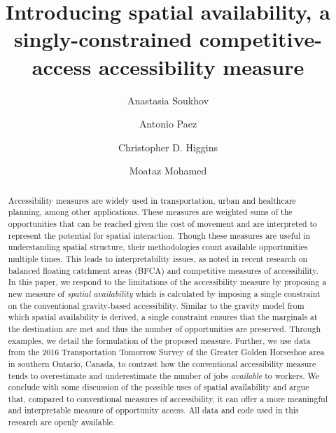 \documentclass[]{elsarticle} %
\begin{document}
\begin{frontmatter}

  \title{Introducing spatial availability, a singly-constrained
competitive-access accessibility measure}
    \author[SEES]{Anastasia Soukhov}
    \author[SEES]{Antonio Paez}
    \author[UofTS]{Christopher D. Higgins}
    \author[CIVENG]{Moataz Mohamed}
      \address[SEES]{School of Earth, Environment and Society, McMaster
University, Hamilton, ON, L8S 4K1, Canada}
    \address[UofTS]{Department of Human Geography, University of Toronto
Scarborough, 1265 Military Trail, Toronto, ON M1C1A4}
    \address[CIVENG]{Department of Civil Engineering, McMaster
University, Hamilton, ON, L8S 4K1, Canada}
  
  \begin{abstract}
  Accessibility measures are widely used in transportation, urban and
  healthcare planning, among other applications. These measures are
  weighted sums of the opportunities that can be reached given the cost
  of movement and are interpreted to represent the potential for spatial
  interaction. Though these measures are useful in understanding spatial
  structure, their methodologies count available opportunities multiple
  times. This leads to interpretability issues, as noted in recent
  research on balanced floating catchment areas (BFCA) and competitive
  measures of accessibility. In this paper, we respond to the
  limitations of the accessibility measure by proposing a new measure of
  \emph{spatial availability} which is calculated by imposing a single
  constraint on the conventional gravity-based accessibility. Similar to
  the gravity model from which spatial availability is derived, a single
  constraint ensures that the marginals at the destination are met and
  thus the number of opportunities are preserved. Through examples, we
  detail the formulation of the proposed measure. Further, we use data
  from the 2016 Transportation Tomorrow Survey of the Greater Golden
  Horseshoe area in southern Ontario, Canada, to contrast how the
  conventional accessibility measure tends to overestimate and
  underestimate the number of jobs \emph{available} to workers. We
  conclude with some discussion of the possible uses of spatial
  availability and argue that, compared to conventional measures of
  accessibility, it can offer a more meaningful and interpretable
  measure of opportunity access. All data and code used in this research
  are openly available.
  \end{abstract}
  
 \end{frontmatter}
\end{document}
